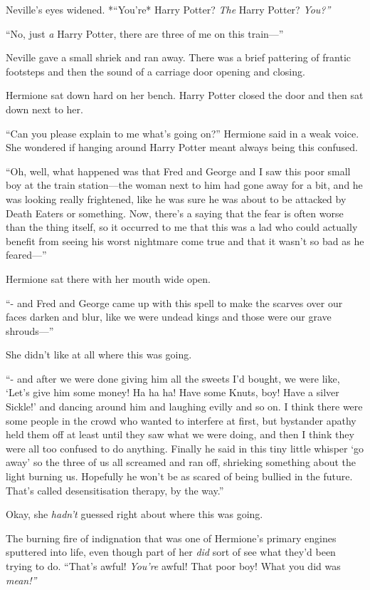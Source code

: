 Neville's eyes widened. *``You're* Harry Potter? \emph{The} Harry
Potter? \emph{You?''}

``No, just \emph{a} Harry Potter, there are three of me on this
train---''

Neville gave a small shriek and ran away. There was a brief pattering of
frantic footsteps and then the sound of a carriage door opening and
closing.

Hermione sat down hard on her bench. Harry Potter closed the door and
then sat down next to her.

``Can you please explain to me what's going on?'' Hermione said in a
weak voice. She wondered if hanging around Harry Potter meant always
being this confused.

``Oh, well, what happened was that Fred and George and I saw this poor
small boy at the train station---the woman next to him had gone away for
a bit, and he was looking really frightened, like he was sure he was
about to be attacked by Death Eaters or something. Now, there's a saying
that the fear is often worse than the thing itself, so it occurred to me
that this was a lad who could actually benefit from seeing his worst
nightmare come true and that it wasn't so bad as he feared---''

Hermione sat there with her mouth wide open.

``- and Fred and George came up with this spell to make the scarves over
our faces darken and blur, like we were undead kings and those were our
grave shrouds---''

She didn't like at all where this was going.

``- and after we were done giving him all the sweets I'd bought, we were
like, `Let's give him some money! Ha ha ha! Have some Knuts, boy! Have a
silver Sickle!' and dancing around him and laughing evilly and so on. I
think there were some people in the crowd who wanted to interfere at
first, but bystander apathy held them off at least until they saw what
we were doing, and then I think they were all too confused to do
anything. Finally he said in this tiny little whisper `go away' so the
three of us all screamed and ran off, shrieking something about the
light burning us. Hopefully he won't be as scared of being bullied in
the future. That's called desensitisation therapy, by the way.''

Okay, she \emph{hadn't} guessed right about where this was going.

The burning fire of indignation that was one of Hermione's primary
engines sputtered into life, even though part of her \emph{did} sort of
see what they'd been trying to do. ``That's awful! \emph{You're} awful!
That poor boy! What you did was \emph{mean!''}

